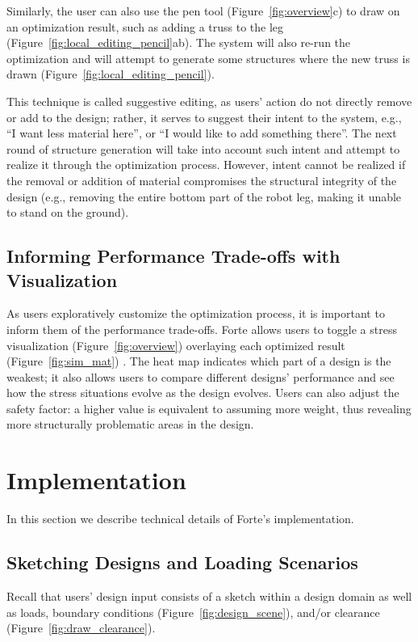 Similarly, the user can also use the pen tool (Figure~\ref{fig:overview}c) to draw on an optimization result, such as adding a truss to the leg (Figure~\ref{fig:local_editing_pencil}ab). The system will also re-run the optimization and will attempt to generate some structures where the new truss is drawn (Figure~\ref{fig:local_editing_pencil}).

This technique is called suggestive editing, as users' action do not directly remove or add to the design; rather, it serves to suggest their intent to the system, e.g., ``I want less material here'', or ``I would like to add something there''. The next round of structure generation will take into account such intent and attempt to realize it through the optimization process. However, intent cannot be realized if the removal or addition of material compromises the structural integrity of the design (e.g., removing the entire bottom part of the robot leg, making it unable to stand on the ground).

\subsection{Informing Performance Trade-offs with Visualization}
As users exploratively customize the optimization process, it is important to inform them of the performance trade-offs. Forte allows users to toggle a stress visualization (Figure~\ref{fig:overview}) overlaying each optimized result (Figure~\ref{fig:sim_mat}) . The heat map indicates which part of a design is the weakest; it also allows users to compare different designs' performance and see how the stress situations evolve as the design evolves. Users can also adjust the safety factor: a higher value is equivalent to assuming more weight, thus revealing more structurally problematic areas in the design.
 

\section{Implementation}
In this section we describe technical details of Forte's implementation. 

\subsection{Sketching Designs and Loading Scenarios}
Recall that users' design input consists of a sketch within a design domain as well as loads, boundary conditions (Figure~\ref{fig:design_scene}), and/or clearance (Figure~\ref{fig:draw_clearance}).

